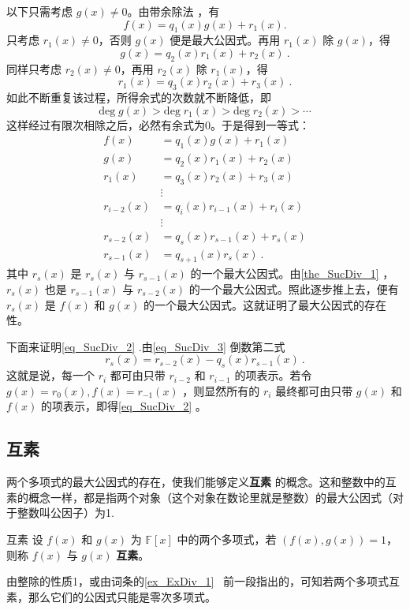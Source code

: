 以下只需考虑 $g(x)\neq 0$。由带余除法 ，有
\begin{equation}
f(x)=q_1(x)g(x)+r_1(x).
\end{equation}
只考虑 $r_1(x)\neq 0$，否则 $g(x)$ 便是最大公因式。再用 $r_1(x)$ 除 $g(x)$，得
\begin{equation}
g(x)=q_2(x)r_1(x)+r_2(x)~.
\end{equation}
同样只考虑 $r_2(x)\neq0$，再用 $r_2(x)$ 除 $r_1(x)$，得
\begin{equation}
r_1(x)=q_3(x)r_2(x)+r_3(x)~.
\end{equation}
如此不断重复该过程，所得余式的次数就不断降低，即
\begin{equation}
\mathrm{deg}\;g(x)>\mathrm{deg}\;r_1(x)>\mathrm{deg}\;r_2(x)>\cdots
\end{equation}
这样经过有限次相除之后，必然有余式为0。于是得到一等式：
\begin{equation}\label{eq_SucDiv_3}
\begin{aligned}
f(x)&=q_1(x)g(x)+r_1(x)\\
g(x)&=q_2(x)r_1(x)+r_2(x)\\
r_1(x)&=q_3(x)r_2(x)+r_3(x)\\
&\vdots\\
r_{i-2}(x)&=q_i(x)r_{i-1}(x)+r_i(x)\\
&\vdots\\
r_{s-2}(x)&=q_s(x)r_{s-1}(x)+r_s(x)\\
r_{s-1}(x)&=q_{s+1}(x)r_s(x)~.
\end{aligned}
\end{equation}
其中 $r_s(x)$ 是 $r_s(x)$ 与 $r_{s-1}(x)$ 的一个最大公因式。由\autoref{the_SucDiv_1} ，$r_s(x)$ 也是 $r_{s-1}(x)$ 与 $r_{s-2}(x)$ 的一个最大公因式。照此逐步推上去，便有 $r_s(x)$ 是 $f(x)$ 和 $g(x)$ 的一个最大公因式。这就证明了最大公因式的存在性。

下面来证明\autoref{eq_SucDiv_2} .由\autoref{eq_SucDiv_3} 倒数第二式
\begin{equation}
r_s(x)=r_{s-2}(x)-q_s(x)r_{s-1}(x)~.
\end{equation}
这就是说，每一个 $r_i$ 都可由只带 $r_{i-2}$ 和 $r_{i-1}$ 的项表示。若令 $g(x)=r_0(x),f(x)=r_{-1}(x)$ ，则显然所有的 $r_i$ 最终都可由只带 $g(x)$ 和 $f(x)$ 的项表示，即得\autoref{eq_SucDiv_2} 。
\subsection{互素}
两个多项式的最大公因式的存在，使我们能够定义\textbf{互素} 的概念。这和整数中的互素的概念一样，都是指两个对象（这个对象在数论里就是整数）的最大公因式（对于整数叫公因子）为1.
\begin{definition}{互素}
设 $f(x)$ 和 $g(x)$ 为 $\mathbb{F}[x]$ 中的两个多项式，若 $(f(x),g(x))=1$，则称 $f(x)$ 与 $g(x)$ \textbf{互素}。
\end{definition}
由整除的性质1，或由词条的\autoref{ex_ExDiv_1}~ 前一段指出的，可知若两个多项式互素，那么它们的公因式只能是零次多项式。

